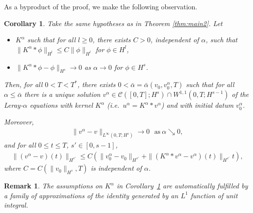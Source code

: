 \documentclass{amsart}
\newtheorem{corollary}{Corollary}
\newtheorem{remark}{Remark}
\begin{document}
As a byproduct of the proof, we make the following observation.
      \begin{corollary}
      \label{corollary: main2}
Take the same hypotheses as in Theorem \ref{thm:main2}. Let 
\begin{itemize}
\item $K^{\alpha}$ such that for all $l\geq 0$, there exists $C>0$, independent of $\alpha$, such that $\|K^{\alpha}*\phi\|_{H^l} \leq C \|\phi\|_{H^l}$ for $\phi \in H^{l}$,
\item $\|K^{\alpha}*\phi-\phi\|_{H^{s}} \to 0$ as $\alpha \to 0$ for $\phi \in H^{s}$. 
\end{itemize}

Then, for all $0<T<T^*$, there exists $0<\bar{\alpha} = \bar{\alpha}(v_0,v_{0}^{\alpha}, T)$ such that for all $\alpha \leq \bar{\alpha}$ there is a unique solution $v^{\alpha} \in \mathcal{C}([0,T];H^s_{}) \cap W^{1,1}(0,T;H^{s-1}_{})$ of the Leray-$\alpha$ equations with kernel $K^{\alpha}$ (i.e.\ $u^{\alpha}=K^{\alpha}*v^{\alpha}$) and with initial datum $v^{\alpha}_{0}$. 

Moreover,
   \begin{equation}
       \begin{aligned}
           \|v^{\alpha}-v\|_{L^{\infty}(0,T;H^s)} \to 0 \ \ \ \text{as} \  \alpha \searrow0,
       \end{aligned}
   \end{equation}
   and for all $0\leq t \leq T$, $s' \in [0,s-1]$,
    \begin{equation}
        \begin{aligned}
            \|(v^{\alpha}-v)(t)\|_{H^{s'}} \leq C\left( \|v^{\alpha}_0-v_0\|_{H^{s'}} + \|(K^{\alpha}*v^{\alpha}-v^{\alpha})(t)\|_{H^{s'}} t\right),
       \end{aligned}
    \end{equation}
where $C=C(\|v_0\|_{H^s},T)$ is independent of $\alpha$.
  \end{corollary} 

\begin{remark}
    The assumptions on $K^{\alpha}$ in Corollary~\ref{corollary: main2} are automatically fulfilled by a family of approximations of the identity generated by an $L^1$ function of unit integral.
\end{remark}
\end{document}
